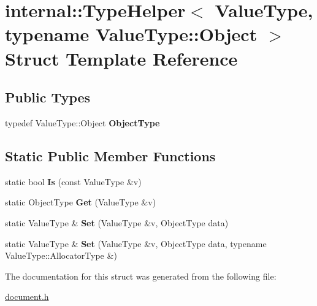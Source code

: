 \hypertarget{a00320}{}\section{internal\+:\+:Type\+Helper$<$ Value\+Type, typename Value\+Type\+:\+:Object $>$ Struct Template Reference}
\label{a00320}
\subsection*{Public Types}
\begin{DoxyCompactItemize}
\item 
typedef Value\+Type\+::\+Object {\bfseries Object\+Type}\hypertarget{a00320_ac5d59bffe76792786fd5f1ba4da94dd9}{}\label{a00320_ac5d59bffe76792786fd5f1ba4da94dd9}

\end{DoxyCompactItemize}
\subsection*{Static Public Member Functions}
\begin{DoxyCompactItemize}
\item 
static bool {\bfseries Is} (const Value\+Type \&v)\hypertarget{a00320_a6c8bcb7479d2c4c96ae6dcaac808e227}{}\label{a00320_a6c8bcb7479d2c4c96ae6dcaac808e227}

\item 
static Object\+Type {\bfseries Get} (Value\+Type \&v)\hypertarget{a00320_ae1debd6b9c125d4206e43a74ddbd0795}{}\label{a00320_ae1debd6b9c125d4206e43a74ddbd0795}

\item 
static Value\+Type \& {\bfseries Set} (Value\+Type \&v, Object\+Type data)\hypertarget{a00320_a7655ed9b6c7443d99063ec20769b9984}{}\label{a00320_a7655ed9b6c7443d99063ec20769b9984}

\item 
static Value\+Type \& {\bfseries Set} (Value\+Type \&v, Object\+Type data, typename Value\+Type\+::\+Allocator\+Type \&)\hypertarget{a00320_a41825b964c6188a07539b7ab2e6ed194}{}\label{a00320_a41825b964c6188a07539b7ab2e6ed194}

\end{DoxyCompactItemize}


The documentation for this struct was generated from the following file\+:\begin{DoxyCompactItemize}
\item 
\hyperlink{a00473}{document.\+h}\end{DoxyCompactItemize}
